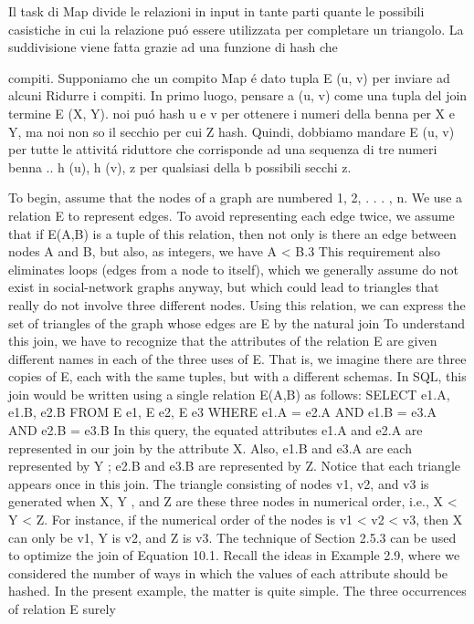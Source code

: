 \documentclass[paper=a4, fontsize=11pt]{scrartcl}	%
\numberwithin{equation}{section}															%
\numberwithin{figure}{section}																%
\numberwithin{table}{section}																%
\begin{document}
Il task di Map divide le relazioni in input in tante parti quante le possibili casistiche in cui la relazione pu\'o essere utilizzata per completare un triangolo. 
La suddivisione viene fatta grazie ad una funzione di hash che

compiti. Supponiamo che un compito Map \'e dato tupla E (u, v) per inviare ad alcuni
Ridurre i compiti. In primo luogo, pensare a (u, v) come una tupla del join termine E (X, Y). noi
pu\'o hash u e v per ottenere i numeri della benna per X e Y, ma noi non so
il secchio per cui Z hash. Quindi, dobbiamo mandare E (u, v) per tutte le attivit\'a riduttore
che corrisponde ad una sequenza di tre numeri benna .. h (u), h (v), z per qualsiasi
della b possibili secchi z.


To begin, assume that the nodes of a graph are numbered 1, 2, . . . , n. We
use a relation E to represent edges. To avoid representing each edge twice,
we assume that if E(A,B) is a tuple of this relation, then not only is there
an edge between nodes A and B, but also, as integers, we have A < B.3
This requirement also eliminates loops (edges from a node to itself), which we
generally assume do not exist in social-network graphs anyway, but which could
lead to triangles that really do not involve three different nodes.
Using this relation, we can express the set of triangles of the graph whose
edges are E by the natural join
To understand this join, we have to recognize that the attributes of the relation
E are given different names in each of the three uses of E. That is, we imagine
there are three copies of E, each with the same tuples, but with a different
schemas. In SQL, this join would be written using a single relation E(A,B) as
follows:
SELECT e1.A, e1.B, e2.B
FROM E e1, E e2, E e3
WHERE e1.A = e2.A AND e1.B = e3.A AND e2.B = e3.B
In this query, the equated attributes e1.A and e2.A are represented in our join
by the attribute X. Also, e1.B and e3.A are each represented by Y ; e2.B and
e3.B are represented by Z.
Notice that each triangle appears once in this join. The triangle consisting
of nodes v1, v2, and v3 is generated when X, Y , and Z are these three nodes in
numerical order, i.e., X < Y < Z. For instance, if the numerical order of the
nodes is v1 < v2 < v3, then X can only be v1, Y is v2, and Z is v3.
The technique of Section 2.5.3 can be used to optimize the join of Equation
10.1. Recall the ideas in Example 2.9, where we considered the number
of ways in which the values of each attribute should be hashed. In the present
example, the matter is quite simple. The three occurrences of relation E surely
\end{document}
